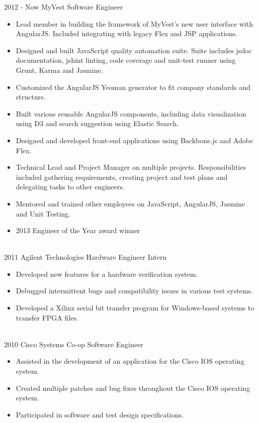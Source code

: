 \documentclass[print]{friggeri-cv}
\begin{document}
\begin{entrylist}
  \entry
    {2012 - Now}
    {MyVest}
    {Software Engineer}
    {\begin{itemize}
    \item Lead member in building the framework of MyVest’s new user interface with AngularJS. Included integrating with legacy Flex and JSP applications.
    \item Designed and built JavaScript quality automation suite. Suite includes jsdoc documentation, jshint linting, code coverage and unit-test runner using Grunt, Karma and Jasmine.
    \item Customized the AngularJS Yeoman generator to fit company standards and structure.
    \item Built various reusable AngularJS components, including data visualization using D3 and search suggestion using Elastic Search.
    \item Designed and developed front-end applications using Backbone.js and Adobe Flex.
    \item Technical Lead and Project Manager on multiple projects. Responsibilities included gathering requirements, creating project and test plans and delegating tasks to other engineers.
    \item Mentored and trained other employees on JavaScript, AngularJS, Jasmine and Unit Testing.
    \item 2013 Engineer of the Year award winner
    \end{itemize}
    }
  \\
  \entry
    {2011}
    {Agilent Technologies}
    {Hardware Engineer Intern}
    {\begin{itemize}
    \item Developed new features for a hardware verification system.
    \item Debugged intermittent bugs and compatibility issues in various test systems.
    \item Developed a Xilinx serial bit transfer program for Windows-based systems to transfer FPGA files.
    \end{itemize}
    }
  \\
  \entry
    {2010}
    {Cisco Systems}
    {Co-op Software Engineer}
    {\begin{itemize}
    \item Assisted in the development of an application for the Cisco IOS operating system.
    \item Created multiple patches and bug fixes throughout the Cisco IOS operating system.
    \item Participated in software and test design specifications.
    \end{itemize}
    }
\end{entrylist}
\end{document}
